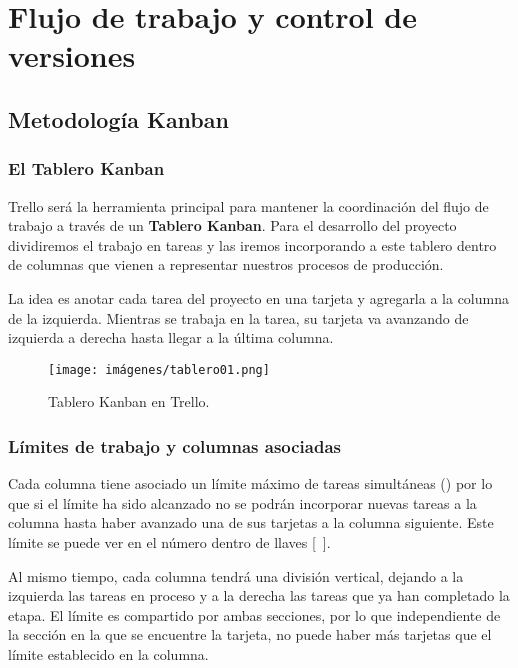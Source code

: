 
\section{Flujo de trabajo y control de versiones}\label{flujo:flujo-de-trabajo}

\subsection{Metodología Kanban}\label{flujo:metodologia-kanban}
\subsubsection{El Tablero Kanban}\label{flujo:tablero-kanban}
Trello será la herramienta principal para mantener la coordinación del flujo de trabajo a través de un \textbf{Tablero Kanban}. Para el desarrollo del proyecto dividiremos el trabajo en tareas y las iremos incorporando a este tablero dentro de columnas que vienen a representar nuestros procesos de producción.

La idea es anotar cada tarea del proyecto en una tarjeta y agregarla a la columna de la izquierda. Mientras se trabaja en la tarea, su tarjeta va avanzando de izquierda a derecha hasta llegar a la última columna.  

\begin{figure}[h]
	\centering
	\texttt{[image: imágenes/tablero01.png]}
	\caption{Tablero Kanban en Trello.}
\end{figure}

\subsubsection{Límites de trabajo y columnas asociadas}\label{flujo:limites-de-trabajo}
Cada columna tiene asociado un límite máximo de tareas simultáneas () por lo que si el límite ha sido alcanzado no se podrán incorporar nuevas tareas a la columna hasta haber avanzado una de sus tarjetas a la columna siguiente. Este límite se puede ver en el número dentro de llaves [~].

Al mismo tiempo, cada columna tendrá una división vertical, dejando a la izquierda las tareas en proceso y a la derecha las tareas que ya han completado la etapa. El límite es compartido por ambas secciones, por lo que independiente de la sección en la que se encuentre la tarjeta, no puede haber más tarjetas que el límite establecido en la columna.

